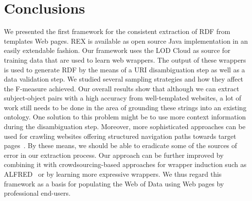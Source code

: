 \section{Conclusions}
\label{sec:conclusions}
We presented the first framework for the consistent extraction of \ac{RDF} from templates Web pages. 
REX is available as open source Java implementation in an easily extendable fashion.
Our framework uses the \ac{LOD} Cloud as source for training data that are used to learn web wrappers. 
The output of these wrappers is used to generate \ac{RDF} by the means of a URI disambiguation step as well as a data validation step.
We studied several sampling strategies and how they affect the F-measure achieved.
Our overall results show that although we can extract subject-object pairs with a high accuracy from well-templated websites, a lot of work still needs to be done in the area of grounding these strings into an existing ontology.
One solution to this problem might be to use more context information during the disambiguation step.
Moreover, more sophisticated approaches can be used for crawling websites offering structured navigation paths towards target pages~\cite{DBLP:conf/webist/BlancoCM05}. 
By these means, we should be able to eradicate some of the sources of error in our extraction process. 
Our approach can be further improved by combining it with crowdsourcing-based approaches for wrapper induction such as ALFRED~\cite{Crescenzi2013} or by learning more expressive wrappers.
We thus regard this framework as a basis for populating the Web of Data using Web pages by professional end-users.

